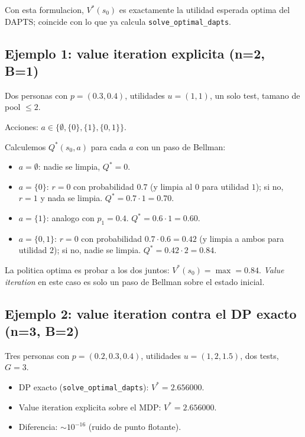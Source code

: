 \documentclass[11pt]{article}
\begin{document}
Con esta formulacion, $V^*(s_0)$ es exactamente la utilidad esperada
optima del DAPTS; coincide con lo que ya calcula
\texttt{solve\_optimal\_dapts}.

\subsection{Ejemplo 1: value iteration explicita (n=2, B=1)}

Dos personas con $p = (0.3, 0.4)$, utilidades $u = (1, 1)$, un solo
test, tamano de pool $\le 2$.

Acciones: $a \in \{\emptyset, \{0\}, \{1\}, \{0,1\}\}$.

Calculemos $Q^*(s_0, a)$ para cada $a$ con un paso de Bellman:

\begin{itemize}
  \item $a = \emptyset$: nadie se limpia, $Q^* = 0$.
  \item $a = \{0\}$: $r = 0$ con probabilidad $0.7$ (y limpia al $0$
    para utilidad $1$); si no, $r = 1$ y nada se limpia.
    $Q^* = 0.7 \cdot 1 = 0.70$.
  \item $a = \{1\}$: analogo con $p_1 = 0.4$. $Q^* = 0.6 \cdot 1 = 0.60$.
  \item $a = \{0, 1\}$: $r = 0$ con probabilidad $0.7 \cdot 0.6 = 0.42$
    (y limpia a ambos para utilidad $2$); si no, nadie se limpia.
    $Q^* = 0.42 \cdot 2 = 0.84$.
\end{itemize}

La politica optima es probar a los dos juntos:
$V^*(s_0) = \max = 0.84$. \emph{Value iteration} en este caso es solo
un paso de Bellman sobre el estado inicial.

\subsection{Ejemplo 2: value iteration contra el DP exacto (n=3, B=2)}

Tres personas con $p = (0.2, 0.3, 0.4)$, utilidades $u = (1, 2, 1.5)$,
dos tests, $G = 3$.

\begin{itemize}
  \item DP exacto (\texttt{solve\_optimal\_dapts}): $V^* = 2.656000$.
  \item Value iteration explicita sobre el MDP: $V^* = 2.656000$.
  \item Diferencia: $\sim 10^{-16}$ (ruido de punto flotante).
\end{itemize}
\end{document}
